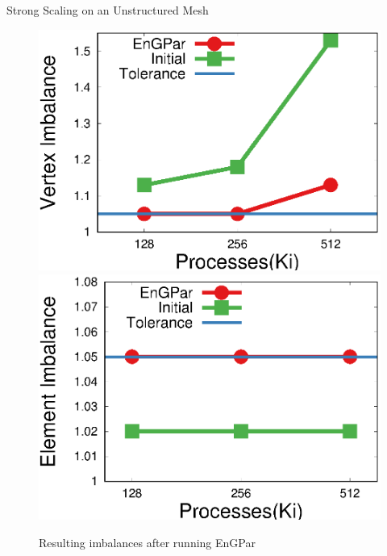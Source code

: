 \documentclass{beamer}
\begin{document}
\begin{textblock}{15.6}
\begin{textblock}{5.1}
\begin{block}{\centering Strong Scaling on an Unstructured Mesh}
      \begin{figure}
        \centering
        \includegraphics[width=.45\textwidth]{../plots/mira_fem_results/vimb_v_cores.eps}
        \includegraphics[width=.45\textwidth]{../plots/mira_fem_results/eimb_v_cores.eps}
        \caption{Resulting imbalances after running EnGPar}
      \end{figure}
    \end{block}


\end{textblock}
\end{textblock}
\end{document}
